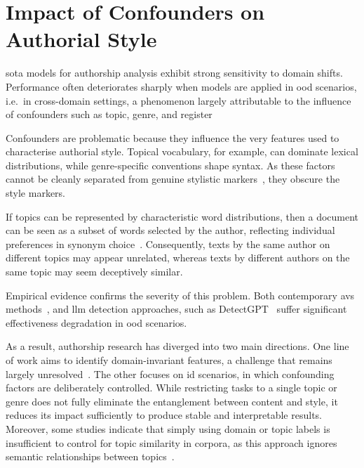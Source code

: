 \section{Impact of Confounders on Authorial Style}
\label{sec:contextual_factors}

\Acl{sota} models for authorship analysis exhibit strong sensitivity to domain shifts. 
Performance often deteriorates sharply when models are applied in \ac{ood} scenarios, i.e.\ in cross-domain settings, a phenomenon largely attributable to the influence of confounders such as topic, genre, and register~\citep{Sundararajan_style_18,bischoff_importance_2020}

Confounders are problematic because they influence the very features used to characterise authorial style. 
Topical vocabulary, for example, can dominate lexical distributions, while genre-specific conventions shape syntax. 
As these factors cannot be cleanly separated from genuine stylistic markers~\citep{bischoff_importance_2020}, they obscure the style markers.

If topics can be represented by characteristic word distributions, then a document can be seen as a subset of words selected by the author, reflecting individual preferences in synonym choice~\citep{altakrori_topic_2021}. 
Consequently, texts by the same author on different topics may appear unrelated, whereas texts by different authors on the same topic may seem deceptively similar.

Empirical evidence confirms the severity of this problem.
Both contemporary \acp{av} methods~\citep{Thomas_cross_topic_24}, and \ac{llm} detection approaches, such as DetectGPT~\citep{mitchell_detectgpt_2023,Wu_ODD_challenges_2025} suffer significant effectiveness degradation in \ac{ood} scenarios.

As a result, authorship research has diverged into two main directions. 
One line of work aims to identify domain-invariant features, a challenge that remains largely unresolved~\citep{bischoff_importance_2020}. 
The other focuses on \ac{id} scenarios, in which confounding factors are deliberately controlled. 
While restricting tasks to a single topic or genre does not fully eliminate the entanglement between content and style, it reduces its impact sufficiently to produce stable and interpretable results. 
Moreover, some studies indicate that simply using domain or topic labels is insufficient to control for topic similarity in corpora, as this approach ignores semantic relationships between topics~\citep{sawatphol_cross_topic_av_24}.
